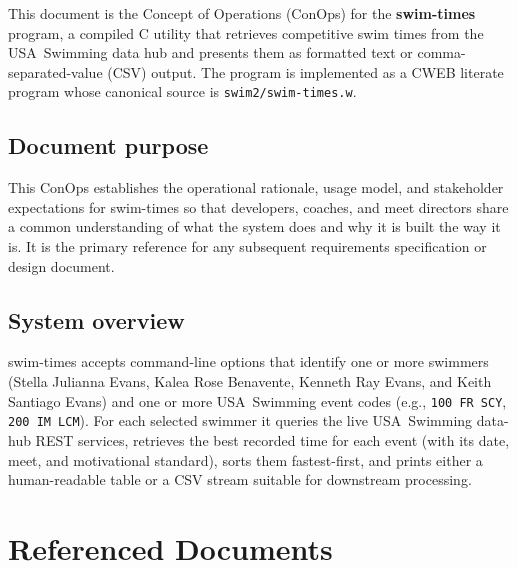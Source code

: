 \documentclass[12pt]{article}
\newcommand{\code}[1]{\texttt{#1}}
\begin{document}
This document is the Concept of Operations (ConOps) for the
\textbf{swim-times} program, a compiled C utility that retrieves
competitive swim times from the USA~Swimming data hub and presents
them as formatted text or comma-separated-value (CSV) output.
The program is implemented as a CWEB literate program whose
canonical source is \code{swim2/swim-times.w}.

\subsection{Document purpose}

This ConOps establishes the operational rationale, usage model,
and stakeholder expectations for swim-times so that developers,
coaches, and meet directors share a common understanding of what
the system does and why it is built the way it is.
It is the primary reference for any subsequent requirements
specification or design document.

\subsection{System overview}

swim-times accepts command-line options that identify one or more
swimmers (Stella Julianna Evans, Kalea Rose Benavente, Kenneth Ray
Evans, and Keith Santiago Evans) and one or more USA~Swimming event
codes (e.g., \code{100 FR SCY}, \code{200 IM LCM}).  For each
selected swimmer it queries the live USA~Swimming data-hub REST
services, retrieves the best recorded time for each event (with its
date, meet, and motivational standard), sorts them fastest-first, and
prints either a human-readable table or a CSV stream suitable for
downstream processing.

\section{Referenced Documents}
\end{document}
